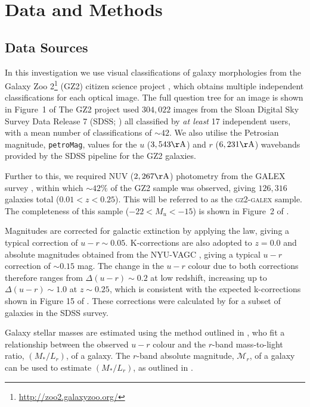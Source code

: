\documentclass[useAMS,usenatbib]{mn2e}
\begin{document}
 
\section{Data and Methods}\label{sec:data}

\subsection{Data Sources}\label{sec:photo}

In this investigation we use visual classifications of galaxy morphologies from the Galaxy Zoo 2\footnote{\url{http://zoo2.galaxyzoo.org/}} (GZ2) citizen science project \citep{GZ2}, which obtains multiple independent classifications for each optical image. The full question tree for an image is shown in Figure~1 of \citeauthor{GZ2}  The GZ2 project used $304, 022$ images from the Sloan Digital Sky Survey Data Release 7 (SDSS; \citealt{york00, abazajian09}) all classified by \emph{at least} 17 independent users, with a mean number of classifications of $\sim42$. We also utilise the Petrosian magnitude, {\tt petroMag}, values for the $u$ ($3,543 \rm{\AA}$) and $r$ ($6,231 \rm{\AA}$) wavebands provided by the SDSS pipeline for the GZ2 galaxies.

Further to this, we required NUV ($2,267 \rm{\AA}$) photometry from the GALEX survey \citep{martin05}, within which $\sim42\%$ of the GZ2 sample was observed, giving $126, 316$ galaxies total ($0.01 < z < 0.25$). This will be referred to as the \textsc{gz2-galex} sample. The completeness of this sample ($-22 < M_u < -15$) is shown in Figure~2 of \cite{smethurst15}. 

Magnitudes are corrected for galactic extinction \citep{Oh11} by applying the \citet{Cardelli89} law, giving a typical correction of $u-r \sim 0.05$. K-corrections are also adopted to $z=0.0$ and absolute magnitudes obtained from the NYU-VAGC \citep{Blanton05, padmanabhan08, blanton07}, giving a typical $u-r$ correction of $\sim 0.15$ mag. The change in the $u-r$ colour due to both corrections therefore ranges from $\Delta (u-r) \sim 0.2$ at low redshift, increasing up to $\Delta (u-r) \sim 1.0$ at $z \sim 0.25$, which is consistent with the expected k-corrections shown in Figure 15 of \citet{blanton07}. These corrections were calculated by \citet{Bamford09} for a subset of galaxies in the SDSS survey.

Galaxy stellar masses are estimated using the method outlined in \cite{Baldry06}, who fit a relationship between the observed $u-r$ colour and the $r$-band mass-to-light ratio, $(M_*/L_r)$, of a galaxy. The $r$-band absolute magnitude, $\mathcal{M}_r$, of a galaxy can be used to estimate $(M_*/L_r)$, as outlined in \cite{blanton01}. 
\end{document}
